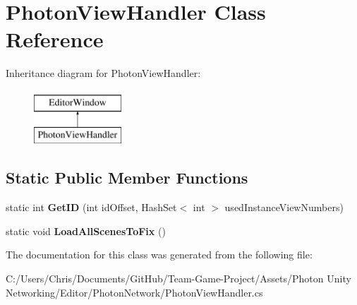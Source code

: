 \hypertarget{class_photon_view_handler}{}\section{Photon\+View\+Handler Class Reference}
\label{class_photon_view_handler}
Inheritance diagram for Photon\+View\+Handler\+:\begin{figure}[H]
\begin{center}
\leavevmode
\includegraphics[height=2.000000cm]{class_photon_view_handler}
\end{center}
\end{figure}
\subsection*{Static Public Member Functions}
\begin{DoxyCompactItemize}
\item 
static int {\bfseries Get\+ID} (int id\+Offset, Hash\+Set$<$ int $>$ used\+Instance\+View\+Numbers)\hypertarget{class_photon_view_handler_a0512a521deb73ec443d70288c7ca2604}{}\label{class_photon_view_handler_a0512a521deb73ec443d70288c7ca2604}

\item 
static void {\bfseries Load\+All\+Scenes\+To\+Fix} ()\hypertarget{class_photon_view_handler_a400a040d4ba1ed78aba778080f0c176a}{}\label{class_photon_view_handler_a400a040d4ba1ed78aba778080f0c176a}

\end{DoxyCompactItemize}


The documentation for this class was generated from the following file\+:\begin{DoxyCompactItemize}
\item 
C\+:/\+Users/\+Chris/\+Documents/\+Git\+Hub/\+Team-\/\+Game-\/\+Project/\+Assets/\+Photon Unity Networking/\+Editor/\+Photon\+Network/Photon\+View\+Handler.\+cs\end{DoxyCompactItemize}
